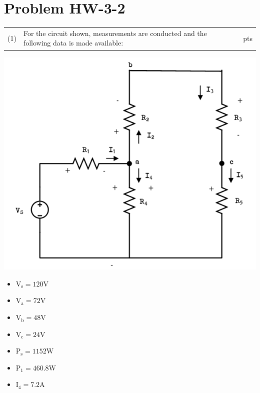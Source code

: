 \documentclass{article}
\newcommand{\problemstatement}[3]{
\noindent
\begin{tabular}{ m{0.5cm} m{42em} m{0.5cm} }
	({#1}) & {#2} & {#3}pts
\end{tabular}
}
\begin{document}
\section{Problem HW-3-2}
\problemstatement{1}{For the circuit shown, measurements are conducted and the following data
is made available:}{}
\includegraphics[width=\textwidth]{problem_2_figure}
\begin{itemize}
	\item $\text{V}_\text{s} = 120 \text{V}$
	\item $\text{V}_\text{a} = 72 \text{V}$
	\item $\text{V}_\text{b} = 48 \text{V}$
	\item $\text{V}_\text{c} = 24 \text{V}$
	\item $\text{P}_\text{s} = 1152 \text{W}$
	\item $\text{P}_\text{1} = 460.8 \text{W}$
	\item $\text{I}_\text{4} = 7.2 \text{A}$
\end{itemize}
\end{document}
